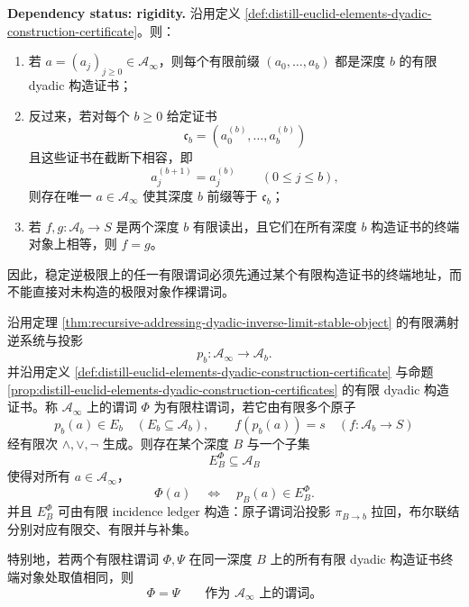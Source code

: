 \begin{proposition}[稳定地址的有限前缀正是构造证书]\label{prop:distill-euclid-elements-dyadic-construction-certificates}
\textbf{Dependency status: rigidity.}
沿用定义 \ref{def:distill-euclid-elements-dyadic-construction-certificate}。则：
\begin{enumerate}
  \item 若 \(a=(a_j)_{j\ge0}\in\mathcal A_\infty\)，则每个有限前缀 \((a_0,\ldots,a_b)\) 都是深度 \(b\) 的有限 dyadic 构造证书；
  \item 反过来，若对每个 \(b\ge0\) 给定证书
  \[
  \mathfrak c_b=(a^{(b)}_0,\ldots,a^{(b)}_b)
  \]
  且这些证书在截断下相容，即
  \[
  a^{(b+1)}_j=a^{(b)}_j
  \qquad(0\le j\le b),
  \]
  则存在唯一 \(a\in\mathcal A_\infty\) 使其深度 \(b\) 前缀等于 \(\mathfrak c_b\)；
  \item 若 \(f,g:\mathcal A_b\to S\) 是两个深度 \(b\) 有限读出，且它们在所有深度 \(b\) 构造证书的终端对象上相等，则 \(f=g\)。
\end{enumerate}
因此，稳定逆极限上的任一有限谓词必须先通过某个有限构造证书的终端地址，而不能直接对未构造的极限对象作裸谓词。
\end{proposition}

\begin{proposition}[有限柱谓词的证书终端正规形]\label{distill:euclid_elements-finite_construction_certificate_families-cylinder-predicate-terminal-normal-form}
沿用定理 \ref{thm:recursive-addressing-dyadic-inverse-limit-stable-object} 的有限满射逆系统与投影
\[
p_b:\mathcal A_\infty\to\mathcal A_b.
\]
并沿用定义 \ref{def:distill-euclid-elements-dyadic-construction-certificate} 与命题 \ref{prop:distill-euclid-elements-dyadic-construction-certificates} 的有限 dyadic 构造证书。称 \(\mathcal A_\infty\) 上的谓词 \(\Phi\) 为有限柱谓词，若它由有限多个原子
\[
p_b(a)\in E_b\quad(E_b\subseteq\mathcal A_b),
\qquad
f(p_b(a))=s\quad(f:\mathcal A_b\to S)
\]
经有限次 \(\wedge,\vee,\neg\) 生成。则存在某个深度 \(B\) 与一个子集
\[
E_B^\Phi\subseteq\mathcal A_B
\]
使得对所有 \(a\in\mathcal A_\infty\)，
\[
\Phi(a)\quad\Longleftrightarrow\quad p_B(a)\in E_B^\Phi.
\]
并且 \(E_B^\Phi\) 可由有限 incidence ledger 构造：原子谓词沿投影 \(\pi_{B\to b}\) 拉回，布尔联结分别对应有限交、有限并与补集。

特别地，若两个有限柱谓词 \(\Phi,\Psi\) 在同一深度 \(B\) 上的所有有限 dyadic 构造证书终端对象处取值相同，则
\[
\Phi=\Psi
\qquad\text{作为 }\mathcal A_\infty\text{ 上的谓词。}
\]
\end{proposition}

